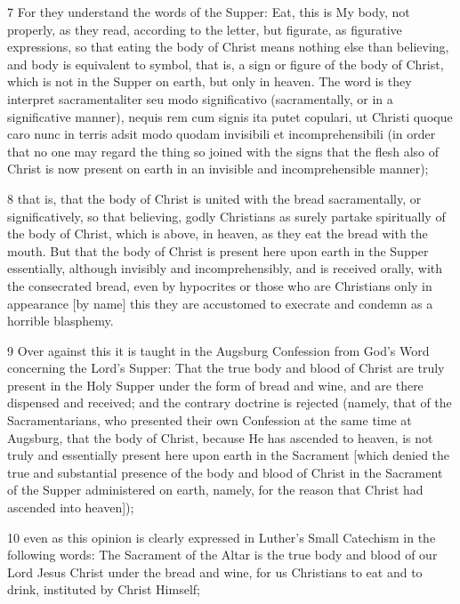 7 For they understand the words of the Supper: Eat, this is My body, not properly, as they read, according to the letter, but figurate, as figurative expressions, so that eating the body of Christ means nothing else than believing, and body is equivalent to symbol, that is, a sign or figure of the body of Christ, which is not in the Supper on earth, but only in heaven. The word is they interpret sacramentaliter seu modo significativo (sacramentally, or in a significative manner), nequis rem cum signis ita putet copulari, ut Christi quoque caro nunc in terris adsit modo quodam invisibili et incomprehensibili (in order that no one may regard the thing so joined with the signs that the flesh also of Christ is now present on earth in an invisible and incomprehensible manner);

8 that is, that the body of Christ is united with the bread sacramentally, or significatively, so that believing, godly Christians as surely partake spiritually of the body of Christ, which is above, in heaven, as they eat the bread with the mouth. But that the body of Christ is present here upon earth in the Supper essentially, although invisibly and incomprehensibly, and is received orally, with the consecrated bread, even by hypocrites or those who are Christians only in appearance [by name] this they are accustomed to execrate and condemn as a horrible blasphemy.

9 Over against this it is taught in the Augsburg Confession from God’s Word concerning the Lord’s Supper: That the true body and blood of Christ are truly present in the Holy Supper under the form of bread and wine, and are there dispensed and received; and the contrary doctrine is rejected (namely, that of the Sacramentarians, who presented their own Confession at the same time at Augsburg, that the body of Christ, because He has ascended to heaven, is not truly and essentially present here upon earth in the Sacrament [which denied the true and substantial presence of the body and blood of Christ in the Sacrament of the Supper administered on earth, namely, for the reason that Christ had ascended into heaven]);

10 even as this opinion is clearly expressed in Luther’s Small Catechism in the following words: The Sacrament of the Altar is the true body and blood of our Lord Jesus Christ under the bread and wine, for us Christians to eat and to drink, instituted by Christ Himself;

